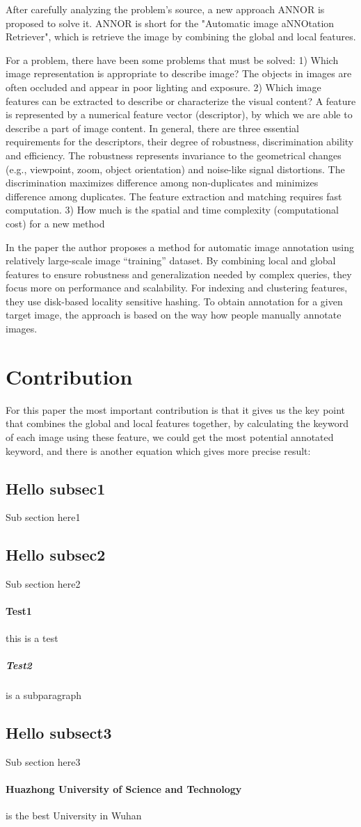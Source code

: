 \documentclass[pdftex,12pt,a4paper]{article}
\begin{document}
After carefully analyzing the problem's source, a new approach ANNOR is proposed to solve it.
ANNOR is short for the "Automatic image aNNOtation Retriever", which is retrieve the image by combining the global
and local features.

For a problem, there have been some problems that must be solved:
1) Which image representation is appropriate to describe image?
The objects in images are often occluded and appear in poor
lighting and exposure.
2) Which image features can be extracted to describe or characterize
the visual content? A feature is represented by a numerical
feature vector (descriptor), by which we are able to describe a
part of image content. In general, there are three essential
requirements for the descriptors, their degree of robustness,
discrimination ability and efficiency. The robustness represents
invariance to the geometrical changes (e.g., viewpoint, zoom,
object orientation) and noise-like signal distortions. The discrimination
maximizes difference among non-duplicates and
minimizes difference among duplicates. The feature extraction
and matching requires fast computation.
3) How much is the spatial and time complexity (computational cost) for a new method

In the paper the author proposes a method for automatic image annotation
using relatively large-scale image “training” dataset. By combining local
and global features to ensure robustness and generalization needed by
complex queries, they focus more on performance and scalability.
For indexing and clustering features, they use disk-based locality
sensitive hashing. To obtain annotation for a given target image, the
approach is based on the way how people manually annotate images.


\section{Contribution}
For this paper the most important contribution is that it gives us the key point that combines the global
and local features together, by calculating the keyword of each image using these feature, we could get the
most potential annotated keyword, and there is another equation which gives more precise result:


\subsection{Hello subsec1} Sub section here1
\subsection{Hello subsec2} Sub section here2
\paragraph{Test1}this is a test
\subparagraph{Test2} is a subparagraph
\subsection{Hello subsect3} Sub section here3
\paragraph{Huazhong University of Science and Technology} is the best University in Wuhan
\end{document}
